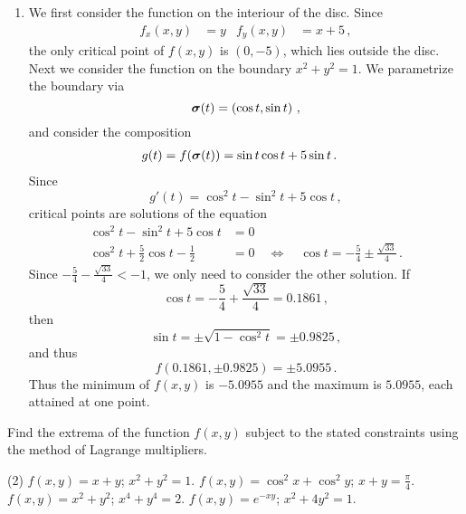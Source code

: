 \begin{solution}
\begin{enumerate}
\item
We first consider the function on the interiour of the disc. Since
\begin{align*}
f_x(x,y) &= y &
f_y(x,y) &= x+5\,,
\end{align*}
the only critical point of $f(x,y)$ is $(0,-5)$, which lies outside the disc. Next we consider the function on the boundary $x^2+y^2 = 1$. We parametrize the boundary via
\[
\bm{\mathrm{\sigma}}(t) = \left( \cos t, \sin t \right)\,,
\]
and consider the composition
\begin{align*}
g(t) &= f(\bm{\mathrm{\sigma}}(t)) = \sin t \cos t + 5\sin t\,.
\end{align*}
Since
\[
g'(t) = \cos^2 t - \sin^2 t + 5 \cos t\,,
\]
critical points are solutions of the equation
\begin{align*}
\cos^2t - \sin^2 t + 5 \cos t &= 0 \\
\cos^2 t + \frac 52 \cos t - \frac 12 &= 0
\quad\Leftrightarrow\quad
\cos t = -\frac 54 \pm \frac{\sqrt{33}}4\,.
\end{align*}
Since $\displaystyle -\frac 54 - \frac{\sqrt{33}}4 < -1$, we only need to consider the other solution. If
\[
\cos t = -\frac 54 + \frac{\sqrt{33}}4 = 0.1861\,,
\]
then
\[
\sin t = \pm \sqrt{1 - \cos^2 t} = \pm 0.9825\,,
\]
and thus
\[
f(0.1861, \pm 0.9825) = \pm 5.0955\,.
\]
Thus the minimum of $f(x,y)$ is $-5.0955$ and the maximum is $5.0955$, each attained at one point.
\end{enumerate}
\end{solution}

\begin{question}
Find the extrema of the function $f(x,y)$ subject to the stated constraints using the method of Lagrange multipliers.
\begin{tasks}(2)
\task
$f(x,y) = x+y$; $x^2+y^2=1$.
\task
$f(x,y) = \cos^2 x + \cos^2 y$; $\displaystyle x+y = \frac \pi 4$.
\task
$f(x,y) = x^2 + y^2$; $x^4 + y^4 = 2$.
\task
$f(x,y) = e^{-xy}$; $x^2 + 4y^2 = 1$.
\end{tasks}
\end{question}

